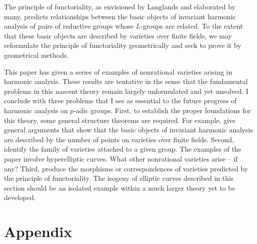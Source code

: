 \documentclass{amsart}
\begin{document}
The principle of functoriality, as envisioned by Langlands and
elaborated
by many, predicts relationships between the basic objects
of invariant harmonic analysis of pairs of reductive groups
whose $L$-groups
are related.  To the extent that these
basic objects are described by varieties over finite fields,
 we may reformulate the principle of functoriality geometrically
 and seek to prove
it by geometrical methods. 

This paper has
given a series of examples of nonrational varieties arising in
harmonic analysis.
These results are tentative in the sense that the fundamental
problems in this nascent theory 
remain largely unformulated and yet unsolved.  
I conclude with three problems that I see as essential to the
future progress of harmonic analysis on $p$-adic groups.
First, to establish the proper foundations for this theory, some
general structure theorems are required.  For example, give general 
arguments that
show that the basic objects of
invariant harmonic analysis are described by the number of points
on varieties over finite fields.
Second,  identify the family of varieties attached to a given group.
The examples of the paper involve hyperelliptic curves.  What
other nonrational varieties arise -- if any?
Third, produce the morphisms or correspondences of varieties predicted
by the principle of functoriality.  The isogeny of elliptic
curves described in this section should be an isolated example within
a much larger theory yet to be developed.

\section{Appendix}
\end{document}
